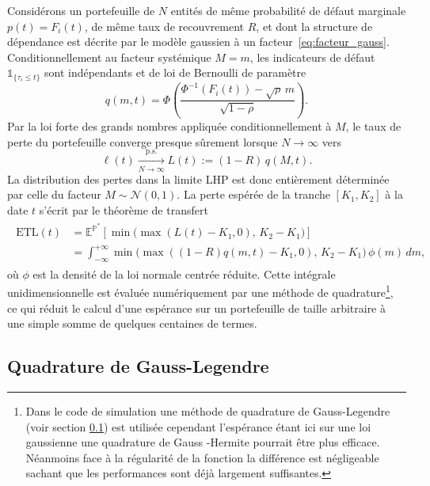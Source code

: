 Considérons un portefeuille de $N$ entités de même probabilité de défaut marginale $p(t) = F_i(t)$,
de même taux de recouvrement $R$, et dont la structure de dépendance est décrite par le modèle
gaussien à un facteur~\eqref{eq:facteur_gauss}. Conditionnellement au facteur systémique $M = m$,
les indicateurs de défaut $\mathbb{1}_{\{\tau_i \leq t\}}$ sont indépendants et de loi de Bernoulli
de paramètre
\begin{equation}
    q(m, t) = \Phi\!\left(\frac{\Phi^{-1}(F_i(t)) - \sqrt{\rho}\, m}{\sqrt{1-\rho}}\right).
\end{equation}
Par la loi forte des grands nombres appliquée conditionnellement à $M$, le taux de perte du
portefeuille converge presque sûrement lorsque $N \to \infty$ vers
\begin{equation}
    \ell(t) \xrightarrow[N\to\infty]{\text{p.s.}} L(t) := (1-R)\, q(M, t).
\end{equation}
La distribution des pertes dans la limite LHP est donc entièrement déterminée par celle du
facteur $M \sim \mathcal{N}(0,1)$. La perte espérée de la tranche $[K_1, K_2]$ à la date $t$ s'écrit
par le théorème de transfert
\begin{align}
    \begin{split}
    \mathrm{ETL}(t) & = \mathbb{E}^{\mathbb{P}^\ast}\!\left[\min\!\bigl(\max(L(t) - K_1, 0),\, K_2 - K_1\bigr)\right] \\
    & = \int_{-\infty}^{+\infty} \min\!\bigl(\max((1-R)q(m,t) - K_1, 0),\, K_2-K_1\bigr)\, \phi(m)\, dm,
    \label{eq:etl_lhp}
    \end{split}
\end{align}
où $\phi$ est la densité de la loi normale centrée réduite. Cette intégrale unidimensionnelle est évaluée
numériquement par une méthode de quadrature\footnote{Dans le code de simulation une méthode de quadrature
de Gauss-Legendre (voir section \ref{subsec:Gauss_Leg}) est utilisée cependant l'espérance étant ici sur une loi gaussienne une quadrature de Gauss
-Hermite pourrait être plus efficace. Néanmoins face à la régularité de la fonction la différence est négligeable
sachant que les performances sont déjà largement suffisantes.}, ce qui réduit le calcul d'une espérance sur un
portefeuille de taille arbitraire à une simple somme de quelques centaines de termes.

\subsection{Quadrature de Gauss-Legendre}\label{subsec:Gauss_Leg}

